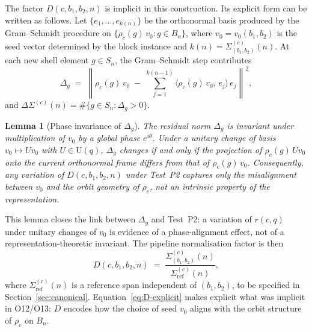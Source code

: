 \documentclass[11pt,a4paper]{article}
\newtheorem{lemma}[theorem]{Lemma}
\theoremstyle{remark}
\newcommand{\rcq}{r(c,q)}
\begin{document}
    The factor $D(c, b_{1}, b_{2}, n)$ is implicit in this construction.
    Its explicit form can be written as follows.
    Let $\{e_{1}, \ldots, e_{k(n)}\}$ be the orthonormal basis produced by the
    Gram--Schmidt procedure on $\{\rho_{c}(g)\,v_{0} : g \in B_{n}\}$, where
    $v_{0} = v_{0}(b_{1}, b_{2})$ is the seed vector determined by the block
    instance and $k(n) = \Sigma^{(c)}_{(b_{1},b_{2})}(n)$.
    At each new shell element $g \in S_{n}$, the Gram--Schmidt step contributes
    \[
      \Delta_{g}
      \;=\;
      \left\|
        \rho_{c}(g)\,v_{0}
        \;-\;
        \sum_{j=1}^{k(n-1)} \langle \rho_{c}(g)\,v_{0},\, e_{j} \rangle\, e_{j}
      \right\|^{2},
    \]
    and $\Delta\Sigma^{(c)}(n) = \#\{g \in S_{n} : \Delta_{g} > 0\}$.

    \begin{lemma}[Phase invariance of $\Delta_{g}$]
      \label{lem:Deltag-phase}
      The residual norm $\Delta_{g}$ is invariant under multiplication of $v_{0}$ by a global
      phase $e^{i\theta}$.
      Under a unitary change of basis $v_{0} \mapsto U v_{0}$ with $U \in \mathrm{U}(q)$,
      $\Delta_{g}$ changes if and only if the projection of $\rho_{c}(g)\,Uv_{0}$ onto the
      current orthonormal frame differs from that of $\rho_{c}(g)\,v_{0}$.
      Consequently, any variation of $D(c, b_{1}, b_{2}, n)$ under Test~P2
      captures only the misalignment between $v_{0}$ and the orbit geometry of $\rho_{c}$,
      not an intrinsic property of the representation.
    \end{lemma}

    \noindent
    This lemma closes the link between $\Delta_{g}$ and Test~P2: a variation of $\rcq$
    under unitary changes of $v_{0}$ is evidence of a phase-alignment effect, not of a
    representation-theoretic invariant.
    The pipeline normalisation factor is then
    \begin{equation}
      \label{eq:D-explicit}
      D(c, b_{1}, b_{2}, n)
      \;=\;
      \frac{\Sigma^{(c)}_{(b_{1},b_{2})}(n)}{\Sigma^{(c)}_{\mathrm{ref}}(n)},
    \end{equation}
    where $\Sigma^{(c)}_{\mathrm{ref}}(n)$ is a reference span independent of
    $(b_{1}, b_{2})$, to be specified in Section~\ref{sec:canonical}.
    Equation~\eqref{eq:D-explicit} makes explicit what was implicit in O12/O13:
    $D$ encodes how the choice of seed $v_{0}$ aligns with the orbit structure
    of $\rho_{c}$ on $B_{n}$.
\end{document}
